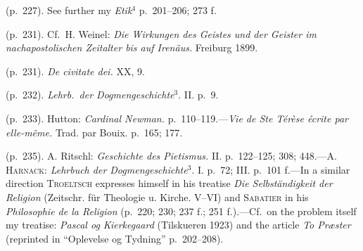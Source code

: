 \documentclass[12pt,a4paper]{book}
\begin{document}
 (p.~227). See further my \emph{Etik}$^4$ p.~201--206; 273 f.

 (p.~231). Cf.\ H. Weinel: \emph{Die Wirkungen des Geistes und der Geister im nachapostolischen
Zeitalter bis auf Irenäus.} Freiburg 1899.

 (p.~231). \emph{De civitate dei.} XX, 9.

 (p.~232). \emph{Lehrb.\ der Dogmengeschichte}$^3$. II. p.~9.

 (p.~233). Hutton: \emph{Cardinal Newman.} p.~110--119.---\emph{Vie de Ste Térèse écrite par
elle-même.} Trad. par Bouix. p.~165; 177.

 (p.~235). A. Ritschl: \emph{Geschichte des Pietismus.} II. p.~122--125; 308; 448.---A.
\textsc{Harnack}: \emph{Lehrbuch der Dogmengeschichte}$^3$. I. p.~72; III. p.~101 f.---In a similar
direction \textsc{Troeltsch} expresses himself in his treatise \emph{Die Selbständigkeit der Religion}
(Zeitschr. für Theologie u. Kirche. V--VI) and \textsc{Sabatier} in his \emph{Philosophie de la
Religion} (p.~220; 230; 237 f.; 251 f.).---Cf.\ on the problem itself my treatise: \emph{Pascal og
Kierkegaard} (Tilskueren 1923) and the article \emph{To Præster} (reprinted in ``Oplevelse og Tydning''
p.~202--208).
\end{document}
